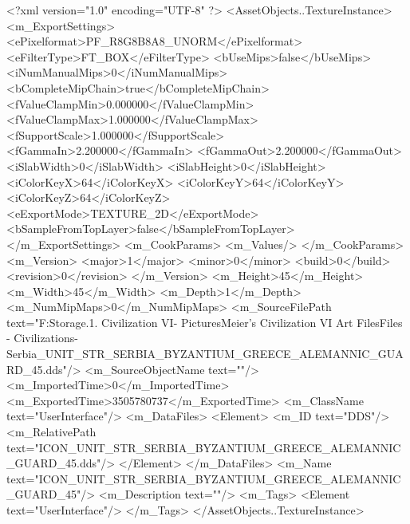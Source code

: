 <?xml version="1.0" encoding="UTF-8" ?>
<AssetObjects..TextureInstance>
	<m_ExportSettings>
		<ePixelformat>PF_R8G8B8A8_UNORM</ePixelformat>
		<eFilterType>FT_BOX</eFilterType>
		<bUseMips>false</bUseMips>
		<iNumManualMips>0</iNumManualMips>
		<bCompleteMipChain>true</bCompleteMipChain>
		<fValueClampMin>0.000000</fValueClampMin>
		<fValueClampMax>1.000000</fValueClampMax>
		<fSupportScale>1.000000</fSupportScale>
		<fGammaIn>2.200000</fGammaIn>
		<fGammaOut>2.200000</fGammaOut>
		<iSlabWidth>0</iSlabWidth>
		<iSlabHeight>0</iSlabHeight>
		<iColorKeyX>64</iColorKeyX>
		<iColorKeyY>64</iColorKeyY>
		<iColorKeyZ>64</iColorKeyZ>
		<eExportMode>TEXTURE_2D</eExportMode>
		<bSampleFromTopLayer>false</bSampleFromTopLayer>
	</m_ExportSettings>
	<m_CookParams>
		<m_Values/>
	</m_CookParams>
	<m_Version>
		<major>1</major>
		<minor>0</minor>
		<build>0</build>
		<revision>0</revision>
	</m_Version>
	<m_Height>45</m_Height>
	<m_Width>45</m_Width>
	<m_Depth>1</m_Depth>
	<m_NumMipMaps>0</m_NumMipMaps>
	<m_SourceFilePath text="F:\Mod Storage\2.1. Civilization VI\Mods\Archive - Pictures\Sid Meier's Civilization VI Art Files\Art Files - Civilizations\Civilization - Serbia\ICON_UNIT_STR_SERBIA_BYZANTIUM_GREECE_ALEMANNIC_GUARD_45.dds"/>
	<m_SourceObjectName text=""/>
	<m_ImportedTime>0</m_ImportedTime>
	<m_ExportedTime>3505780737</m_ExportedTime>
	<m_ClassName text="UserInterface"/>
	<m_DataFiles>
		<Element>
			<m_ID text="DDS"/>
			<m_RelativePath text="ICON_UNIT_STR_SERBIA_BYZANTIUM_GREECE_ALEMANNIC_GUARD_45.dds"/>
		</Element>
	</m_DataFiles>
	<m_Name text="ICON_UNIT_STR_SERBIA_BYZANTIUM_GREECE_ALEMANNIC_GUARD_45"/>
	<m_Description text=""/>
	<m_Tags>
		<Element text="UserInterface"/>
	</m_Tags>
</AssetObjects..TextureInstance>

